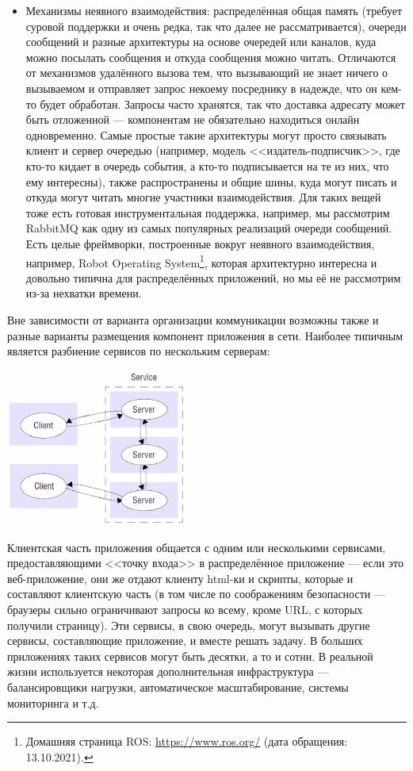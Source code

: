 \documentclass{../../text-style}
\begin{document}
\begin{itemize}
    \item Механизмы неявного взаимодействия: распределённая общая память (требует суровой поддержки и очень редка, так что далее не рассматривается), очереди сообщений и разные архитектуры на основе очередей или каналов, куда можно посылать сообщения и откуда сообщения можно читать. Отличаются от механизмов удалённого вызова тем, что вызывающий не знает ничего о вызываемом и отправляет запрос некоему посреднику в надежде, что он кем-то будет обработан. Запросы часто хранятся, так что доставка адресату может быть отложенной --- компонентам не обязательно находиться онлайн одновременно. Самые простые такие архитектуры могут просто связывать клиент и сервер очередью (например, модель <<издатель-подписчик>>, где кто-то кидает в очередь события, а кто-то подписывается на те из них, что ему интересны), также распространены и общие шины, куда могут писать и откуда могут читать многие участники взаимодействия. Для таких вещей тоже есть готовая инструментальная поддержка, например, мы рассмотрим RabbitMQ как одну из самых популярных реализаций очереди сообщений. Есть целые фреймворки, построенные вокруг неявного взаимодействия, например, Robot Operating System\footnote{Домашняя страница ROS: \url{https://www.ros.org/} (дата обращения: 13.10.2021).}, которая архитектурно интересна и довольно типична для распределённых приложений, но мы её не рассмотрим из-за нехватки времени.
\end{itemize}

Вне зависимости от варианта организации коммуникации возможны также и разные варианты размещения компонент приложения в сети. Наиболее типичным является разбиение сервисов по нескольким серверам:

\begin{center}
    \includegraphics[width=0.45\textwidth]{clientServer.png}
\end{center}

Клиентская часть приложения общается с одним или несколькими сервисами, предоставляющими <<точку входа>> в распределённое приложение --- если это веб-приложение, они же отдают клиенту html-ки и скрипты, которые и составляют клиентскую часть (в том числе по соображениям безопасности --- браузеры сильно ограничивают запросы ко всему, кроме URL, с которых получили страницу). Эти сервисы, в свою очередь, могут вызывать другие сервисы, составляющие приложение, и вместе решать задачу. В больших приложениях таких сервисов могут быть десятки, а то и сотни. В реальной жизни используется некоторая дополнительная инфраструктура --- балансировщики нагрузки, автоматическое масштабирование, системы мониторинга и т.д.
\end{document}
